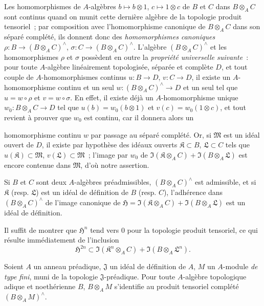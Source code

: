 \begin{env}[7.7.6]
\label{0.7.7.6-fr}
Les homomorphismes de $A$-algèbres $b\mapsto b\otimes 1$,
$c\mapsto 1\otimes c$ de $B$ et $C$ dans $B\otimes_A C$ sont continus
quand on munit cette dernière algèbre de la topologie produit tensoriel~;
par composition avec l'homomorphisme canonique de $B\otimes_A C$ dans son
séparé complété, ils donnent donc des \emph{homomorphismes canoniques}
$\rho:B\to(B\otimes_A C)^\wedge$, $\sigma:C\to(B\otimes_A C)^\wedge$.
L'algèbre $(B\otimes_A C)^\wedge$ et les homomorphismes $\rho$ et $\sigma$
possèdent en outre la \emph{propriété universelle suivante}~: pour toute
$A$-algèbre linéairement topologisée, séparée et complète $D$, et tout
couple de $A$-homomorphismes continus $u:B\to D$, $v:C\to D$, il existe un
$A$-homomorphisme continu et un seul
$w:(B\otimes_A C)^\wedge\to D$ et un seul tel que $u=w\circ\rho$ et
$v=w\circ\sigma$. En effet, il existe déjà un $A$-homomorphisme unique
$w_0:B\otimes_A C\to D$ tel que $u(b)=w_0(b\otimes 1)$ et
$v(c)=w_0(1\otimes c)$, et tout revient à prouver que $w_0$ est continu,
car il donnera alors un


homomorphisme continu $w$ par passage au séparé complété. Or, si
$\mathfrak M$ est un idéal ouvert de $D$, il existe par hypothèse des idéaux
ouverts $\mathfrak K\subset B$, $\mathfrak L\subset C$ tels que
$u(\mathfrak K)\subset\mathfrak M$, $v(\mathfrak L)\subset\mathfrak M$~;
l'image par $w_0$ de
$\Im(\mathfrak K\otimes_A C)+\Im(B\otimes_A\mathfrak L)$ est encore
contenue dans $\mathfrak M$, d'où notre assertion.
\end{env}

\begin{proposition}[7.7.7]
\label{0.7.7.7-fr}
Si $B$ et $C$ sont deux $A$-algèbres préadmissibles,
$(B\otimes_A C)^\wedge$ est admissible, et si $\mathfrak K$ (resp.
$\mathfrak L$) est un idéal de définition de $B$ (resp. $C$), l'adhérence
dans $(B\otimes_A C)^\wedge$ de l'image canonique de
$\mathfrak H=\Im(\mathfrak K\otimes_A C)+\Im(B\otimes_A\mathfrak L)$ est
un idéal de définition.
\end{proposition}

Il suffit de montrer que $\mathfrak H^n$ tend vers $0$ pour la topologie
produit tensoriel, ce qui résulte immédiatement de l'inclusion
\[
  \mathfrak H^{2n}\subset
  \Im(\mathfrak K^n\otimes_A C)+\Im(B\otimes_A\mathfrak L^n).
\]

\begin{proposition}[7.7.8]
\label{0.7.7.8-fr}
Soient $A$ un anneau préadique, $\mathfrak J$ un idéal de définition de
$A$, $M$ un $A$-module \emph{de type fini}, muni de la topologie
$\mathfrak J$-préadique. Pour toute $A$-algèbre topologique adique et
noethérienne $B$, $B\otimes_A M$ s'identifie au produit tensoriel complété
$(B\otimes_A M)^\wedge$.
\end{proposition}

